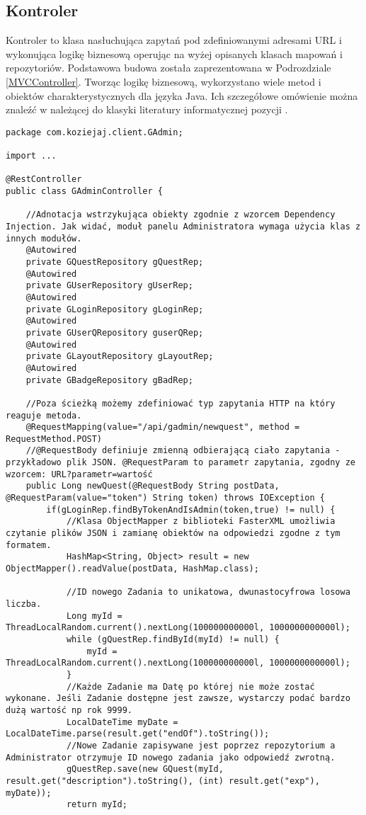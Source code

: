 \documentclass[a4paper,12pt,twoside,openany]{report}
\begin{document}
\subsection{Kontroler}
Kontroler to klasa nasłuchująca  zapytań pod zdefiniowanymi adresami URL i wykonująca logikę biznesową operując na wyżej opisanych klasach mapowań i repozytoriów. Podstawowa budowa została zaprezentowana w Podrozdziale \ref{MVCController}. Tworząc logikę biznesową, wykorzystano wiele metod i obiektów charakterystycznych dla języka Java. Ich szczegółowe omówienie można znaleźć w należącej do klasyki literatury informatycznej pozycji \cite{Java}.
\begin{lstlisting}
package com.koziejaj.client.GAdmin;

import ...

@RestController
public class GAdminController {

	//Adnotacja wstrzykująca obiekty zgodnie z wzorcem Dependency Injection. Jak widać, moduł panelu Administratora wymaga użycia klas z innych modułów.
    @Autowired
    private GQuestRepository gQuestRep;
    @Autowired
    private GUserRepository gUserRep;
    @Autowired
    private GLoginRepository gLoginRep;
    @Autowired
    private GUserQRepository guserQRep;
    @Autowired
    private GLayoutRepository gLayoutRep;
    @Autowired
    private GBadgeRepository gBadRep;
	
	//Poza ścieżką możemy zdefiniować typ zapytania HTTP na który reaguje metoda.
    @RequestMapping(value="/api/gadmin/newquest", method = RequestMethod.POST)
    //@RequestBody definiuje zmienną odbierającą ciało zapytania - przykładowo plik JSON. @RequestParam to parametr zapytania, zgodny ze wzorcem: URL?parametr=wartość
    public Long newQuest(@RequestBody String postData, @RequestParam(value="token") String token) throws IOException {
        if(gLoginRep.findByTokenAndIsAdmin(token,true) != null) {
	        //Klasa ObjectMapper z biblioteki FasterXML umożliwia czytanie plików JSON i zamianę obiektów na odpowiedzi zgodne z tym formatem.
            HashMap<String, Object> result = new ObjectMapper().readValue(postData, HashMap.class);
            
			//ID nowego Zadania to unikatowa, dwunastocyfrowa losowa liczba.
            Long myId = ThreadLocalRandom.current().nextLong(100000000000l, 1000000000000l);
            while (gQuestRep.findById(myId) != null) {
                myId = ThreadLocalRandom.current().nextLong(100000000000l, 1000000000000l);
            }
            //Każde Zadanie ma Datę po której nie może zostać wykonane. Jeśli Zadanie dostępne jest zawsze, wystarczy podać bardzo dużą wartość np rok 9999.
            LocalDateTime myDate = LocalDateTime.parse(result.get("endOf").toString());
            //Nowe Zadanie zapisywane jest poprzez repozytorium a Administrator otrzymuje ID nowego zadania jako odpowiedź zwrotną.
            gQuestRep.save(new GQuest(myId, result.get("description").toString(), (int) result.get("exp"), myDate));
            return myId;


\end{lstlisting}
\end{document}
